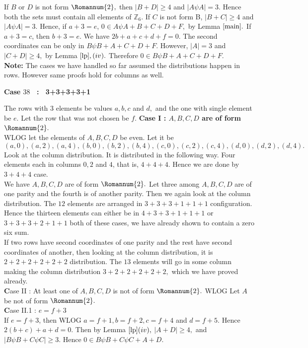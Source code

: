 \documentclass[reqno,10pt]{amsart}
\newtheorem{remar}[prop]{Remark}
\newcommand{\ZZ}{{\mathbb Z}}
\newcommand{\two}{\Romannum {2}}
\begin{document}
 If $B$ or $D$ is not form $\two,$ then $|B+D|\geq 4$ and $|A\psi A|=3.$ Hence both the sets must contain all elements of $\ZZ_6.$ 
 If $C$ is not form B, $|B+C|\geq 4$ and $|A\psi A|=3.$  Hence, if $a+3=e$, $ 0 \in A\psi A+B+C+D+F,$  by Lemma $\ref{main}.$ If $a+3=c$, then $b+3=e.$ We have $2b+a+c+d+f=0$. The second coordinates can be only in $B\psi B+A+C+D+F$. However, 
 $|A|=3$ and $|C+D|\geq4,$ by Lemma $\ref{lp}, (iv).$ Therefore $0 \in B\psi B+A+C+D+F.$\\
\textbf{Note:} The cases we have handled so far assumed the distributions happen in rows. However same proofs hold for columns as well.
\begin{center}
\textbf{Case $38$ \ : \ 3+3+3+3+1}
\end{center}
The rows with 3 elements be values $a, b, c$ and $d,$ and the one with single element be $e.$ Let the row that was not chosen be $f.$ 
\textbf{Case I : $A,B,C,D$ are of form $\two.$ }\\
WLOG let the elements of  $A,B,C,D$ be even. Let it be $$(a,0),(a,2),(a,4),(b,0),(b,2),(b,4),(c,0),(c,2),(c,4),(d,0),(d,2),(d,4).$$ Look at the column distribution. It is distributed in the following way. Four elements each in columns $0,2$ and $4$, that is, $4+4+4$. Hence we are done by $3+4+4$ case.
\\
We have $A,B,C,D$ are of form $\two.$ Let three among $A,B,C,D$ are of one parity and the fourth is of another parity. Then we again look at the column distribution. The $12$ elements are arranged in $3+3+3+1+1+1$ configuration. Hence the thirteen elements can either be in $4+3+3+1+1+1$ or $3+3+3+2+1+1$ both of these cases, we have already shown to contain a zero six sum.
\\
If two rows have second coordinates of one parity and the rest have second coordinates of another, then looking at the column distribution, it is $2+2+2+2+2+2$ distribution. The $13$ elements will go in some column making the column distribution $3+2+2+2+2+2,$ which we have proved already.\\
{\textbf Case II : } At least one of $A,B,C,D$ is not of form $\two.$
WLOG Let $A$ be not of form $\two.$\\ 
{\textbf Case II.1 : $e=f+3$}\\
If $e=f+3$, then WLOG $a=f+1, b= f+2, c=f+4$ and $d=f+5.$ Hence $2(b+c) + a+d =0.$ Then by Lemma $\ref{lp} (iv),$ $|A+D| \geq 4,$ and $|B \psi B+C \psi C| \geq 3.$ Hence $0 \in B \psi B+C \psi C +A +D.$\\ 
\end{document}
